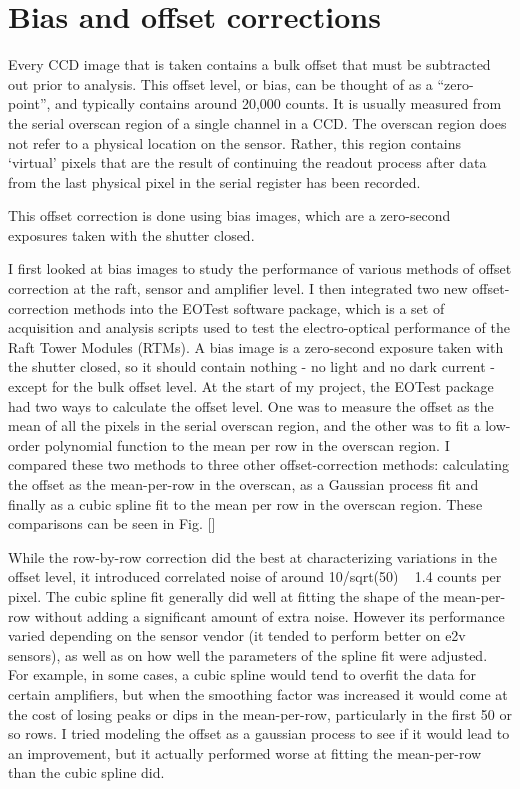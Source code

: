 \section{Bias and offset corrections}

Every CCD image that is taken contains a bulk offset that must be subtracted out prior to analysis. This offset level, or bias, can be thought of as a ``zero-point'', and typically contains around 20,000 counts. It is usually measured from the serial overscan region of a single channel in a CCD. The overscan region does not refer to a physical location on the sensor. Rather, this region contains ‘virtual’ pixels that are the result of continuing the readout process after data from the last physical pixel in the serial register has been recorded. 


This offset correction is done using bias images, which are a zero-second exposures taken with the shutter closed. %

I first looked at bias images to study the performance of various methods of offset correction at the raft, sensor and amplifier level. I then integrated two new offset-correction methods into the EOTest software package, which is a set of acquisition and analysis scripts used to test the electro-optical performance of the Raft Tower Modules (RTMs). A bias image is a zero-second exposure taken with the shutter closed, so it should contain nothing - no light and no dark current - except for the bulk offset level. At the start of my project, the EOTest package had two ways to calculate the offset level. One was to measure the offset as the mean of all the pixels in the serial overscan region, and the other was to fit a low-order polynomial function to the mean per row in the overscan region. I compared these two methods to three other offset-correction methods: calculating the offset as the mean-per-row in the overscan, as a Gaussian process fit and finally as a cubic spline fit to the mean per row in the overscan region. These comparisons can be seen in Fig. []

While the row-by-row correction did the best at characterizing variations in the offset level, it introduced correlated noise of around 10/sqrt(50) ~ 1.4 counts per pixel. The cubic spline fit generally did well at fitting the shape of the mean-per-row without adding a significant amount of extra noise. However its performance varied depending on the sensor vendor (it tended to perform better on e2v sensors), as well as on how well the parameters of the spline fit were adjusted. For example, in some cases, a cubic spline would tend to overfit the data for certain amplifiers, but when the smoothing factor was increased it would come at the cost of losing peaks or dips in the mean-per-row, particularly in the first 50 or so rows. I tried modeling the offset as a gaussian process to see if it would lead to an improvement, but it actually performed worse at fitting the mean-per-row than the cubic spline did. 

